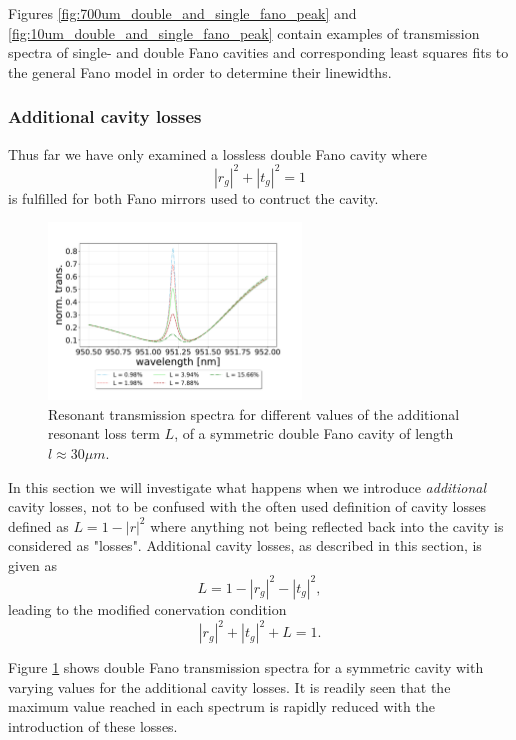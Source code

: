 Figures \ref{fig:700um_double_and_single_fano_peak} and \ref{fig:10um_double_and_single_fano_peak} contain examples of transmission spectra of single- and double Fano cavities and corresponding least squares fits to the general Fano model in order to determine their linewidths. 

\subsubsection{Additional cavity losses}

Thus far we have only examined a lossless double Fano cavity where
\begin{equation}
    |r_g|^2 + |t_g|^2 = 1
\end{equation}
is fulfilled for both Fano mirrors used to contruct the cavity.

\begin{figure}[h!]
    \centering
    \includegraphics[width=0.6\textwidth]{figures/double_fano_loss_scan.pdf}
    \caption{Resonant transmission spectra for different values of the additional resonant loss term $L$, of a symmetric double Fano cavity of length $l \approx 30 \mu m$.}
    \label{fig:double_loss_scan}
\end{figure}

In this section we will investigate what happens when we introduce \emph{additional} cavity losses, not to be confused with the often used definition of cavity losses defined as $L=1-|r|^2$ where anything not being reflected back into the cavity is considered as "losses". Additional cavity losses, as described in this section, is given as
\begin{equation}
    L = 1 - |r_g|^2 - |t_g|^2,
\end{equation}
leading to the modified conervation condition
\begin{equation}
    |r_g|^2 + |t_g|^2 + L = 1.
\end{equation}

Figure \ref{fig:double_loss_scan} shows double Fano transmission spectra for a symmetric cavity with varying values for the additional cavity losses. It is readily seen that the maximum value reached in each spectrum is rapidly reduced with the introduction of these losses. 

